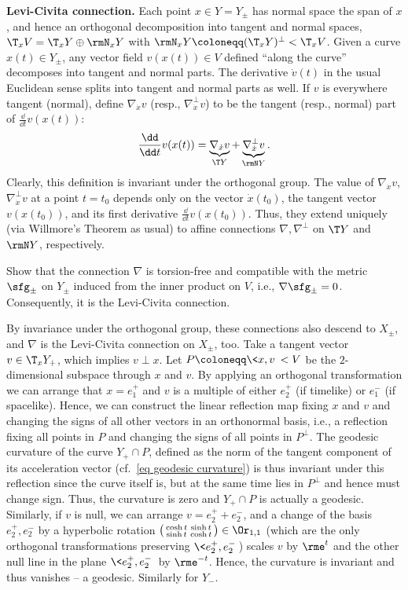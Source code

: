 \textbf{Levi-Civita connection.} Each point $x\in Y=Y_\pm $ has normal space the span of $x$, and hence an orthogonal decomposition into tangent and normal spaces, $\T_x V=\T_x Y\oplus \rmN_x Y$ with $\rmN_x Y\coloneqq (\T_x Y)^\perp <\T_x V$. Given a curve $x(t)\in Y_\pm$, any vector field $v(x(t))\in V$ defined ``along the curve'' decomposes into tangent and normal parts. The derivative $\dot v(t)$ in the usual Euclidean sense splits into tangent and normal parts as well. If $v$ is everywhere tangent (normal), define $\nabla_{\dot x}v$ (resp., $\nabla_{\dot x}^\perp v$) to be the tangent (resp., normal) part of $\frac{\dd}{\dd t} v(x(t))$:
\[\frac{\dd}{\dd t} v(x(t))=\underbrace{\nabla_{\dot x}v}_{\T Y}+\underbrace{\nabla_{\dot x}^\perp v}_{\rmN Y}.\]  
Clearly, this definition is invariant under the orthogonal group. The value of $\nabla_{\dot x}v$, $\nabla_{\dot x}^\perp v$ at a point $t=t_0$ depends only on the vector $\dot x(t_0)$, the tangent vector $v(x(t_0))$, and its first derivative $\frac{\dd}{\dd t} v(x(t_0))$. Thus, they extend uniquely (via Willmore's Theorem as usual) to affine connections $\nabla,\nabla^\perp$ on $\T Y$ and $\rmN Y$, respectively.

\begin{xca}
    Show that the connection $\nabla$ is torsion-free and compatible with the metric $\sfg_\pm$ on $Y_\pm$ induced from the inner product on $V$, i.e., $\nabla\sfg_\pm=0$. Consequently, it is the Levi-Civita connection.
\end{xca}

By invariance under the orthogonal group, these connections also descend to $X_\pm$, and $\nabla$ is the Levi-Civita connection on $X_\pm$, too. Take a tangent vector $v\in \T_x Y_+$, which implies $v\perp x$. Let $P\coloneqq \<x,v\><V$ be the $2$-dimensional subspace through $x$ and $v$.  By applying an orthogonal transformation we can arrange that $x=e_1^+$ and $v$ is a multiple of either $e_2^+$ (if timelike) or $e_1^-$ (if spacelike). Hence, we can construct the linear reflection map fixing $x$ and $v$ and changing the signs of all other vectors in an orthonormal basis, i.e., a reflection fixing all points in $P$ and changing the signs of all points in $P^\perp$. The geodesic curvature of the curve $Y_+\cap P$, defined as the norm of the tangent component of its acceleration vector (cf.\ \ref{eq geodesic curvature}) is thus invariant under this reflection since the curve itself is, but at the same time lies in $P^\perp$ and hence must change sign. Thus, the curvature is zero and $Y_+\cap P$ is actually a geodesic. Similarly, if $v$ is null, we can arrange $v=e_2^++e_2^-$, and a change of the basis $e_2^+, e_2^-$ by a hyperbolic rotation $\left(\begin{smallmatrix}
    \cosh t & \sinh t\\\sinh t & \cosh t
\end{smallmatrix}\right)\in\Or_{1,1}$ (which are the only orthogonal transformations preserving $\<e_2^+, e_2^-\>$) scales $v$ by $\rme^t$ and the other null line in the plane $\<e_2^+, e_2^-\>$  by $\rme^{-t}$. Hence, the curvature is invariant and thus vanishes -- a geodesic. Similarly for $Y_-$. 

